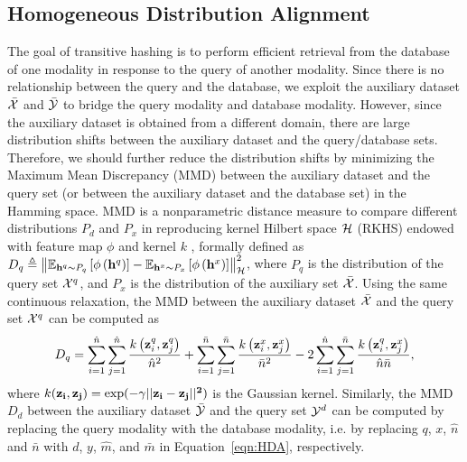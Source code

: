 \documentclass{article}
\begin{document}
\subsection{Homogeneous Distribution Alignment}
The goal of transitive hashing is to perform efficient retrieval from the database of one modality in response to the query of another modality. Since there is no relationship between the query and the database, we exploit the auxiliary dataset ${\bar{\cal X}}$ and ${\bar{\cal Y}}$ to bridge the query modality and database modality. However, since the auxiliary dataset is obtained from a different domain, there are large distribution shifts between the auxiliary dataset and the query/database sets. Therefore, we should further reduce the distribution shifts by minimizing the Maximum Mean Discrepancy (MMD) \cite{cite:JMLR12MMD} between the auxiliary dataset and the query set (or between the auxiliary dataset and the database set) in the Hamming space. MMD is a nonparametric distance measure to compare different distributions $P_d$ and $P_x$ in reproducing kernel Hilbert space ${\cal H}$ (RKHS) endowed with feature map $\phi$ and kernel $k$ \cite{cite:JMLR12MMD}, formally defined as $D_q \triangleq \left\| {{\mathbb{E}_{{{\bf{h}}^q}\sim{P_q}}}\left[ {\phi \left( {{{\bf{h}}^q}} \right)} \right] - {\mathbb{E}_{{{\bf{h}}^x}\sim{P_x}}}\left[ {\phi \left( {{{\bf{h}}^x}} \right)} \right]} \right\|_\mathcal{H}^2$, where $P_q$ is the distribution of the query set ${\cal X}^q$, and $P_x$ is the distribution of the auxiliary set ${\bar{\cal X}}$. Using the same continuous relaxation, the MMD between the auxiliary dataset ${\bar{\cal X}}$ and the query set ${\cal X}^q$ can be computed as
\begin{equation}\label{eqn:HDA}
  {D_q} = \sum\limits_{i = 1}^{\hat n} {\sum\limits_{j = 1}^{\hat n} {\frac{{k\left( {{\bf{z}}_i^q,{\bf{z}}_j^q} \right)}}{{{\hat n^2}}}} }  + \sum\limits_{i = 1}^{\bar n} {\sum\limits_{j = 1}^{\bar n} {\frac{{k\left( {{\bf{z}}_i^x,{\bf{z}}_j^x} \right)}}{{{{\bar n}^2}}}} }  - 2\sum\limits_{i = 1}^{\hat n} {\sum\limits_{j = 1}^{\bar n} {\frac{{k\left( {{\bf{z}}_i^q,{\bf{z}}_j^x} \right)}}{{{\hat n}\bar n}}} },
\end{equation}
where $k(\bf{z}_i, \bf{z}_j) = \exp(-\gamma||\bf{z}_i-\bf{z}_j||^2)$ is the Gaussian kernel. Similarly, the MMD $D_d$ between the auxiliary dataset ${\bar{\cal Y}}$ and the query set ${\cal Y}^d$ can be computed by replacing the query modality with the database modality, i.e. by replacing $q$, $x$, $\hat n$ and ${\bar n}$ with $d$, $y$, $\hat m$, and ${\bar m}$ in Equation~\eqref{eqn:HDA}, respectively.
\end{document}
